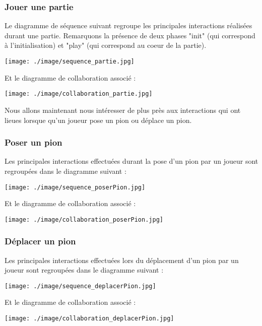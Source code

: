 \documentclass[12pt , a4paper]{article}
\begin{document}
\subsubsection{Jouer une partie}
\noindent Le diagramme de séquence suivant regroupe les principales interactions réalisées durant une partie. Remarquons la présence de deux phases "init" (qui correspond à l'initialisation) et "play" (qui correspond au coeur de la partie).
	\begin{center}
	  \texttt{[image: ./image/sequence\_partie.jpg]}
	\end{center}
\noindent Et le diagramme de collaboration associé :
	\begin{center}
	  \texttt{[image: ./image/collaboration\_partie.jpg]}
	\end{center}
\noindent Nous allons maintenant nous intéresser de plus près aux interactions qui ont lieues lorsque qu'un joueur pose un pion ou déplace un pion.

\begin{landscape}
\subsubsection{Poser un pion}
\noindent Les principales interactions effectuées durant la pose d'un pion par un joueur sont regroupées dans le diagramme suivant :
	\begin{center}
	  \texttt{[image: ./image/sequence\_poserPion.jpg]}
	  \end{center}
\end{landscape}
\noindent Et le diagramme de collaboration associé :
	\begin{center}
	  \texttt{[image: ./image/collaboration\_poserPion.jpg]}
	\end{center}
\begin{landscape}
\subsubsection{Déplacer un pion}
\noindent Les principales interactions effectuées lors du déplacement d'un pion par un joueur sont regroupées dans le diagramme suivant :
	\begin{center}
  \texttt{[image: ./image/sequence\_deplacerPion.jpg]}
	\end{center}
\end{landscape}
\noindent Et le diagramme de collaboration associé :
	\begin{center}
	  \texttt{[image: ./image/collaboration\_deplacerPion.jpg]}
	\end{center}
	
\end{document}
